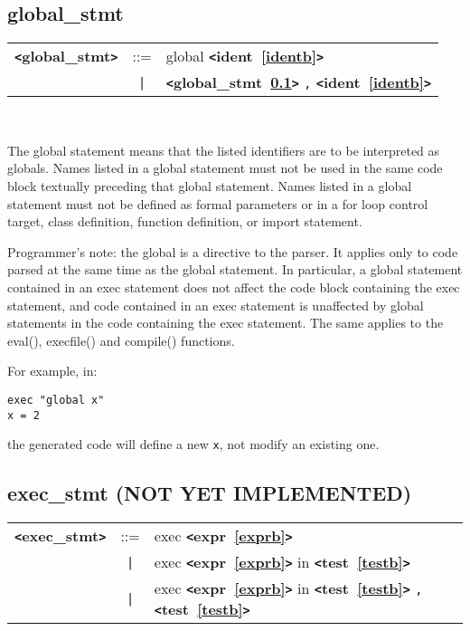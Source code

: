 \documentclass[12pt]{article}
\begin{document}
\subsection{global\_stmt}
\label{globalzzzstmtb}
\begin{tabular}{lcl}
{\bf \verb+<+global\_stmt\verb+>+} & ::=  & global {\bf \verb+<+ident~\ref{identb}\verb+>+}  \\
 & \verb+|+  & {\bf \verb+<+global\_stmt~\ref{globalzzzstmtb}\verb+>+}  \verb|,| {\bf \verb+<+ident~\ref{identb}\verb+>+}  \\
\end{tabular} \\


The global statement means that the listed identifiers are to be interpreted as globals.
Names listed in a global statement must not be used in the same code block 
textually preceding that global statement. Names listed in a global statement 
must not be defined as formal parameters or in a for loop control target, 
class definition, function definition, or import statement.  

Programmer's note: the global is a directive to the parser. 
It applies only to code parsed at the same time as the global statement. 
In particular, a global statement contained in an exec statement does not 
affect the code block containing the exec statement, and code contained in 
an exec statement is unaffected by global statements in the code containing 
the exec statement. The same applies to the eval(), execfile() and compile() 
functions.

For example, in:
\begin{verbatim}
exec "global x"
x = 2
\end{verbatim}
the generated code will define a new \verb|x|, not modify an existing one.

\subsection{exec\_stmt (NOT YET IMPLEMENTED)}
\label{execzzzstmtb}
\begin{tabular}{lcl}
{\bf \verb+<+exec\_stmt\verb+>+} & ::=  & exec {\bf \verb+<+expr~\ref{exprb}\verb+>+}  \\
 & \verb+|+  & exec {\bf \verb+<+expr~\ref{exprb}\verb+>+}  in {\bf \verb+<+test~\ref{testb}\verb+>+}  \\
 & \verb+|+  & exec {\bf \verb+<+expr~\ref{exprb}\verb+>+}  in {\bf \verb+<+test~\ref{testb}\verb+>+}  \verb|,| {\bf \verb+<+test~\ref{testb}\verb+>+}  \\
\end{tabular} \\
\end{document}
